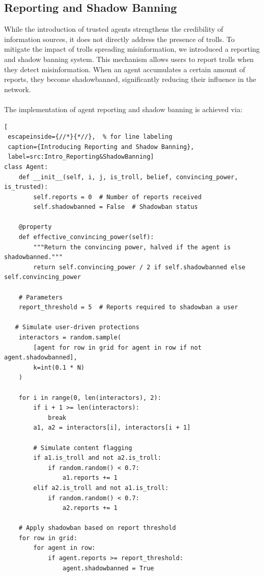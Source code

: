 \documentclass[a4paper,11pt]{scrartcl}
\begin{document}
\subsection{Reporting and Shadow Banning}
While the introduction of trusted agents strengthens the credibility of information sources, it does not directly address the presence of trolls. To mitigate the impact of trolls spreading misinformation, we introduced a reporting and shadow banning system. This mechanism allows users to report trolls when they detect misinformation. When an agent accumulates a certain amount of reports, they become shadowbanned, significantly reducing their influence in the network.
\paragraph{}The implementation of agent reporting and shadow banning is achieved via:
\begin{lstlisting}[
 escapeinside={//*}{*//},  % for line labeling
 caption={Introducing Reporting and Shadow Banning},
 label=src:Intro_Reporting&ShadowBanning]
class Agent:
    def __init__(self, i, j, is_troll, belief, convincing_power, is_trusted):
        self.reports = 0  # Number of reports received
        self.shadowbanned = False  # Shadowban status

    @property
    def effective_convincing_power(self):
        """Return the convincing power, halved if the agent is shadowbanned."""
        return self.convincing_power / 2 if self.shadowbanned else self.convincing_power     

    # Parameters
    report_threshold = 5  # Reports required to shadowban a user                                 

   # Simulate user-driven protections
    interactors = random.sample(
        [agent for row in grid for agent in row if not agent.shadowbanned],
        k=int(0.1 * N)
    )

    for i in range(0, len(interactors), 2):
        if i + 1 >= len(interactors):
            break
        a1, a2 = interactors[i], interactors[i + 1]

        # Simulate content flagging
        if a1.is_troll and not a2.is_troll:
            if random.random() < 0.7:
                a1.reports += 1
        elif a2.is_troll and not a1.is_troll:
            if random.random() < 0.7:
                a2.reports += 1

    # Apply shadowban based on report threshold
    for row in grid:
        for agent in row:
            if agent.reports >= report_threshold:
                agent.shadowbanned = True
\end{lstlisting}   
\end{document}
